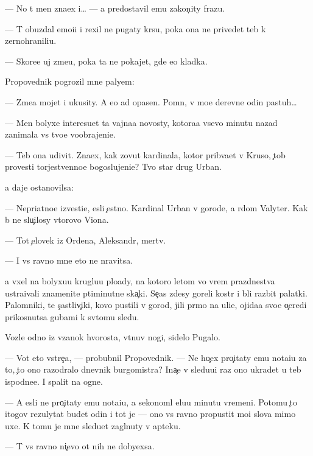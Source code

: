 \documentclass[10pt]{book}
\begin{document}
— No t{\yi} men{\ia} zna{\y}ex i… — {\Y}a predostavil {\y}emu zakon{\c}ity frazu.

— T{\yi} obuzdal emo{\q}i{\y}i i rexil ne pugaty kr{\yi}su, poka ona ne privedet teb{\ia} k zernohranili{\x}u.

— Skore{\y}e uj zme{\y}u, poka ta ne pokajet, gde {\y}e{\y}o kladka.

Propovednik pogrozil mne paly{\q}em:

— Zme{\y}a mojet i ukusity. A {\y}e{\y}o {\y}ad opasen. Pomn{\iu}, v mo{\y}e{\y} derevne odin pastuh…

— Men{\ia} bolyxe interesu{\y}et ta vajna{\y}a novosty, kotora{\y}a vsevo minutu nazad zanimala vs{\e} tvo{\y}e voobrajeni{\y}e.

— Teb{\ia} ona udivit. Zna{\y}ex, kak zovut kardinala, kotor{\yi}{\y} prib{\yi}va{\y}et v Kruso, {\c}tob{\yi} provesti torjestvenno{\y}e bogoslujeni{\y}e? Tvo{\y} star{\yi}{\y} drug Urban.

{\Y}a daje ostanovilsa:

— Nepri{\y}atno{\y}e izvesti{\y}e, {\y}esli {\c}estno. Kardinal Urban v gorode, a r{\ia}dom Valyter. Kak b{\yi} ne slu{\c}ilosy vtorovo Viona.

— Tot {\c}elovek iz Ordena, Aleksandr, mertv.

— I vs{\e} ravno mne eto ne nravitsa.

{\Y}a v{\yi}xel na bolyxu{\y}u kruglu{\y}u plo{\x}ady, na kotoro{\y} letom vo vrem{\ia} prazdnestva ustra{\y}ivali znamenit{\yi}{\y}e p{\ia}timinutn{\yi}{\y}e ska{\c}ki. Se{\y}{\c}as zdesy goreli kostr{\yi} i b{\yi}li razbit{\yi} palatki. Palomniki, te s{\c}astliv{\c}iki, kovo pustili v gorod, jili pr{\ia}mo na uli{\q}e, ojida{\y}a svo{\y}e{\y} o{\c}eredi prikosnutsa gubami k sv{\ia}tomu sledu.

Vozle odno{\y} iz v{\ia}zanok hvorosta, v{\yi}t{\ia}nuv nogi, sidelo Pugalo.

— Vot eto vstre{\c}a, — probubnil Propovednik. — Ne ho{\c}ex pro{\c}itaty {\y}emu nota{\q}i{\y}u za to, {\c}to ono razodralo dnevnik burgomistra? Ina{\c}e v sledu{\y}u{\x}i{\y} raz ono ukradet u teb{\ia} ispodne{\y}e. I spalit na ogne.

— A {\y}esli ne pro{\c}itaty {\y}emu nota{\q}i{\y}u, {\y}a sekonoml{\iu} {\q}elu{\y}u minutu vremeni. Potomu {\c}to itogov{\yi}{\y} rezulytat budet odin i tot je — ono vs{\e} ravno propustit mo{\y}i slova mimo uxe{\y}. K tomu je mne sledu{\y}et zagl{\ia}nuty v apteku.

— T{\yi} vs{\e} ravno ni{\c}evo ot nih ne dobyexsa.
\end{document}

